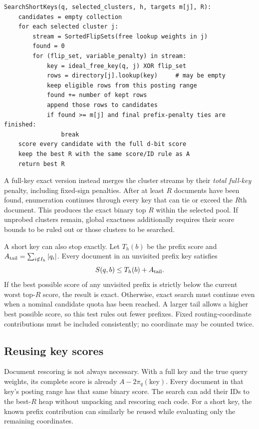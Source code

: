 \par\noindent\begin{minipage}{\linewidth}
\begin{lstlisting}[caption={Short-key candidate search with explicit per-cluster targets.}]
SearchShortKeys(q, selected_clusters, h, targets m[j], R):
    candidates = empty collection
    for each selected cluster j:
        stream = SortedFlipSets(free lookup weights in j)
        found = 0
        for (flip_set, variable_penalty) in stream:
            key = ideal_free_key(q, j) XOR flip_set
            rows = directory[j].lookup(key)     # may be empty
            keep eligible rows from this posting range
            found += number of kept rows
            append those rows to candidates
            if found >= m[j] and final prefix-penalty ties are finished:
                break
    score every candidate with the full d-bit score
    keep the best R with the same score/ID rule as A
    return best R
\end{lstlisting}
\end{minipage}\par

A full-key exact version instead merges the cluster streams by their \emph{total full-key}
penalty, including fixed-sign penalties. After at least $R$ documents have been found, enumeration continues
through every key that can tie or exceed the $R$th document. This produces the exact binary
top $R$ within the selected pool. If unprobed clusters remain, global exactness additionally
requires their score bounds to be ruled out or those clusters to be searched.

A short key can also stop exactly. Let $T_h(b)$ be the prefix score and
$A_{\rm tail}=\sum_{i\notin I_h}|q_i|$. Every document in an unvisited prefix key satisfies
\begin{equation}
S(q,b)\leq T_h(b)+A_{\rm tail}.
\label{eq:prefix-bound}
\end{equation}
If the best possible score of any unvisited prefix is strictly below the current worst
top-$R$ score, the result is exact. Otherwise, exact search must continue even when a nominal candidate quota has been reached.
A larger tail allows a higher best possible score, so this test rules out fewer prefixes. Fixed routing-coordinate contributions must be
included consistently; no coordinate may be counted twice.

\subsection{Reusing key scores}
Document rescoring is not always necessary. With a full key and the true query weights,
its complete score is already
$A-2\pi_q(\text{key})$. Every document in that key's posting range has that same binary score.
The search can add their IDs to the best-$R$ heap without unpacking and rescoring each code.
For a short key, the known prefix contribution can similarly be reused while evaluating
only the remaining coordinates.

